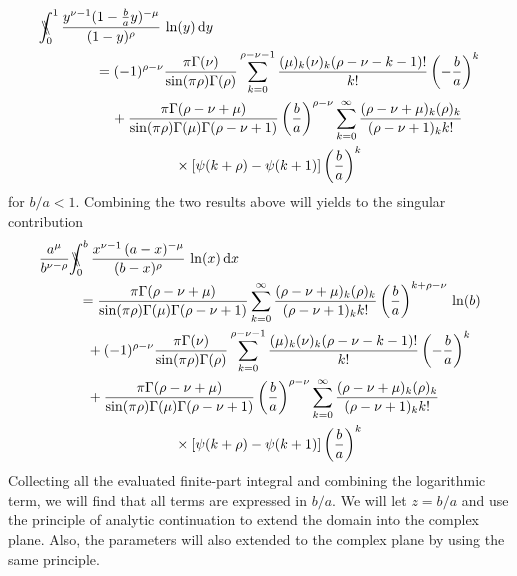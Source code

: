 \begin{equation}
\begin{split}
&\bbint{0}{1} \frac{y^{\nu-1} (1-\frac{b}{a}y)^{-\mu}}{(1-y)^{\rho}}\,\ln(y)\,\mathrm{d}y\\ &\hspace{14mm}=(-1)^{\rho-\nu} \frac{\pi \Gamma(\nu)}{\sin(\pi\rho) \Gamma(\rho)} \sum_{k=0}^{\rho-\nu-1} \frac{(\mu)_k (\nu)_k (\rho-\nu-k-1)!}{k!}\left(-\frac{b}{a}\right)^k\\
&\hspace{18mm} +\frac{\pi \Gamma(\rho-\nu+\mu)}{\sin(\pi\rho) \Gamma(\mu) \Gamma(\rho-\nu+1)} \left(\frac{b}{a}\right)^{\rho-\nu} \sum_{k=0}^{\infty} \frac{(\rho-\nu+\mu)_k (\rho)_k}{(\rho-\nu+1)_k k!} \\
&\hspace{34mm}\times \left[\psi(k+\rho)-\psi(k+1)\right]\left(\frac{b}{a}\right)^k
\end{split}
\end{equation}
for $b/a < 1$.
Combining the two results above will yields to the singular contribution 
\begin{equation}
\begin{split}
&\frac{a^{\mu}}{b^{\nu-\rho}} \bbint{0}{b} \frac{x^{\nu-1} \, (a-x)^{-\mu}}{(b-x)^{\rho}} \, \ln(x)\, \mathrm{d}x\\
&\hspace{10mm}=\frac{\pi \Gamma(\rho-\nu+\mu)}{\sin(\pi\rho) \Gamma(\mu) \Gamma(\rho-\nu+1)}  \sum_{k=0}^{\infty} \frac{(\rho-\nu+\mu)_k (\rho)_k}{(\rho-\nu+1)_k k!}\left(\frac{b}{a}\right)^{k+\rho-\nu}\,\ln(b)\\
&\hspace{12mm}+(-1)^{\rho-\nu} \frac{\pi \Gamma(\nu)}{\sin(\pi\rho) \Gamma(\rho)} \sum_{k=0}^{\rho-\nu-1} \frac{(\mu)_k (\nu)_k (\rho-\nu-k-1)!}{k!}\left(-\frac{b}{a}\right)^k\\
&\hspace{12mm} +\frac{\pi \Gamma(\rho-\nu+\mu)}{\sin(\pi\rho) \Gamma(\mu) \Gamma(\rho-\nu+1)} \left(\frac{b}{a}\right)^{\rho-\nu} \sum_{k=0}^{\infty} \frac{(\rho-\nu+\mu)_k (\rho)_k}{(\rho-\nu+1)_k k!} \\
&\hspace{34mm}\times \left[\psi(k+\rho)-\psi(k+1)\right]\left(\frac{b}{a}\right)^k
\end{split}
\end{equation} 
Collecting all the evaluated finite-part integral and combining the logarithmic term, we will find that all terms are expressed in $b/a$. We will let $z = b/a$ and use the principle of analytic continuation to extend the domain into the complex plane. Also, the parameters will also extended to the complex plane by using the same principle. 
